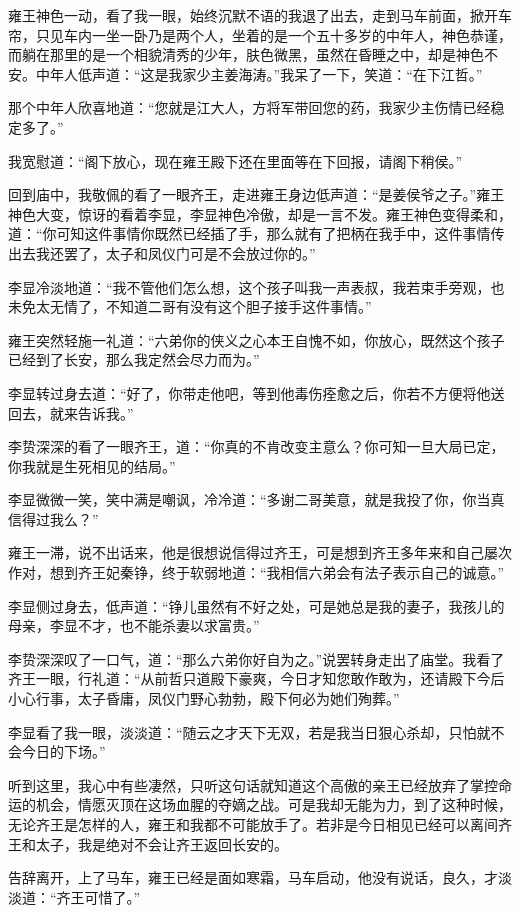 雍王神色一动，看了我一眼，始终沉默不语的我退了出去，走到马车前面，掀开车帘，只见车内一坐一卧乃是两个人，坐着的是一个五十多岁的中年人，神色恭谨，而躺在那里的是一个相貌清秀的少年，肤色微黑，虽然在昏睡之中，却是神色不安。中年人低声道：“这是我家少主姜海涛。”我呆了一下，笑道：“在下江哲。”

那个中年人欣喜地道：“您就是江大人，方将军带回您的药，我家少主伤情已经稳定多了。”

我宽慰道：“阁下放心，现在雍王殿下还在里面等在下回报，请阁下稍侯。”

回到庙中，我敬佩的看了一眼齐王，走进雍王身边低声道：“是姜侯爷之子。”雍王神色大变，惊讶的看着李显，李显神色冷傲，却是一言不发。雍王神色变得柔和，道：“你可知这件事情你既然已经插了手，那么就有了把柄在我手中，这件事情传出去我还罢了，太子和凤仪门可是不会放过你的。”

李显冷淡地道：“我不管他们怎么想，这个孩子叫我一声表叔，我若束手旁观，也未免太无情了，不知道二哥有没有这个胆子接手这件事情。”

雍王突然轻施一礼道：“六弟你的侠义之心本王自愧不如，你放心，既然这个孩子已经到了长安，那么我定然会尽力而为。”

李显转过身去道：“好了，你带走他吧，等到他毒伤痊愈之后，你若不方便将他送回去，就来告诉我。”

李贽深深的看了一眼齐王，道：“你真的不肯改变主意么？你可知一旦大局已定，你我就是生死相见的结局。”

李显微微一笑，笑中满是嘲讽，冷冷道：“多谢二哥美意，就是我投了你，你当真信得过我么？”

雍王一滞，说不出话来，他是很想说信得过齐王，可是想到齐王多年来和自己屡次作对，想到齐王妃秦铮，终于软弱地道：“我相信六弟会有法子表示自己的诚意。”

李显侧过身去，低声道：“铮儿虽然有不好之处，可是她总是我的妻子，我孩儿的母亲，李显不才，也不能杀妻以求富贵。”

李贽深深叹了一口气，道：“那么六弟你好自为之。”说罢转身走出了庙堂。我看了齐王一眼，行礼道：“从前哲只道殿下豪爽，今日才知您敢作敢为，还请殿下今后小心行事，太子昏庸，凤仪门野心勃勃，殿下何必为她们殉葬。”

李显看了我一眼，淡淡道：“随云之才天下无双，若是我当日狠心杀却，只怕就不会今日的下场。”

听到这里，我心中有些凄然，只听这句话就知道这个高傲的亲王已经放弃了掌控命运的机会，情愿灭顶在这场血腥的夺嫡之战。可是我却无能为力，到了这种时候，无论齐王是怎样的人，雍王和我都不可能放手了。若非是今日相见已经可以离间齐王和太子，我是绝对不会让齐王返回长安的。

告辞离开，上了马车，雍王已经是面如寒霜，马车启动，他没有说话，良久，才淡淡道：“齐王可惜了。”

